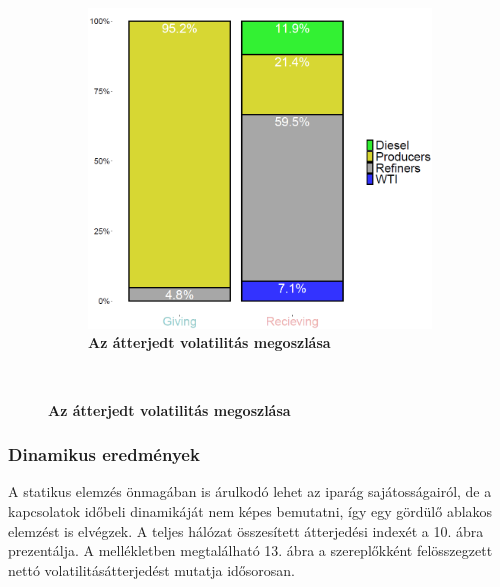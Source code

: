 \documentclass[12pt,bibliography=totoc]{article}
\begin{document}
\begin{figure}[H]
\begin{subfigure}{.5\linewidth}
\end{subfigure}%
\begin{subfigure}{.5\linewidth}
\centering
\includegraphics[width=\linewidth]{barchart}
\caption{\textbf{Az átterjedt volatilitás megoszlása}}
\end{subfigure}\\[1ex]
\end{figure}


\subsubsection{Dinamikus eredmények}

A statikus elemzés önmagában is árulkodó lehet az iparág sajátosságairól, de a kapcsolatok időbeli dinamikáját nem képes bemutatni, így egy gördülő ablakos elemzést is elvégzek. A teljes hálózat összesített átterjedési indexét a 10. ábra prezentálja. A mellékletben megtalálható 13. ábra a szereplőkként felösszegzett nettó volatilitásátterjedést mutatja idősorosan.
\end{document}
